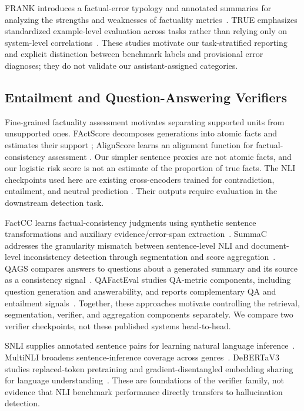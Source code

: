 \documentclass[conference,a4paper]{IEEEtran}
\begin{document}
FRANK introduces a factual-error typology and annotated summaries for analyzing the strengths and weaknesses of factuality metrics~\cite{frank}.
TRUE emphasizes standardized example-level evaluation across tasks rather than relying only on system-level correlations~\cite{truebenchmark}.
These studies motivate our task-stratified reporting and explicit distinction between benchmark labels and provisional error diagnoses; they do not validate our assistant-assigned categories.

\subsection{Entailment and Question-Answering Verifiers}
Fine-grained factuality assessment motivates separating supported units from unsupported ones. FActScore decomposes generations into atomic facts and estimates their support \cite{factscore}; AlignScore learns an alignment function for factual-consistency assessment \cite{alignscore}. Our simpler sentence proxies are not atomic facts, and our logistic risk score is not an estimate of the proportion of true facts. The NLI checkpoints used here are existing cross-encoders trained for contradiction, entailment, and neutral prediction \cite{smallcard,basecard}. Their outputs require evaluation in the downstream detection task.

FactCC learns factual-consistency judgments using synthetic sentence transformations and auxiliary evidence/error-span extraction~\cite{factcc}.
SummaC addresses the granularity mismatch between sentence-level NLI and document-level inconsistency detection through segmentation and score aggregation~\cite{summac}.
QAGS compares answers to questions about a generated summary and its source as a consistency signal~\cite{qags}.
QAFactEval studies QA-metric components, including question generation and answerability, and reports complementary QA and entailment signals~\cite{qafacteval}.
Together, these approaches motivate controlling the retrieval, segmentation, verifier, and aggregation components separately. We compare two verifier checkpoints, not these published systems head-to-head.

SNLI supplies annotated sentence pairs for learning natural language inference~\cite{snli}.
MultiNLI broadens sentence-inference coverage across genres~\cite{multinli}.
DeBERTaV3 studies replaced-token pretraining and gradient-disentangled embedding sharing for language understanding~\cite{debertav3}.
These are foundations of the verifier family, not evidence that NLI benchmark performance directly transfers to hallucination detection.
\end{document}
